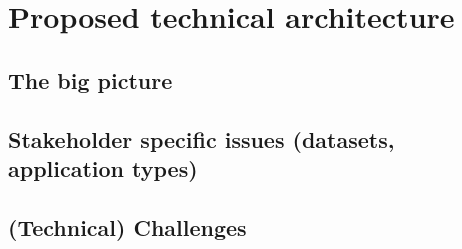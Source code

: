 \section{Proposed technical architecture}
\subsection{The big picture}
\subsection{Stakeholder specific issues (datasets, application types)}
\subsection{(Technical) Challenges}